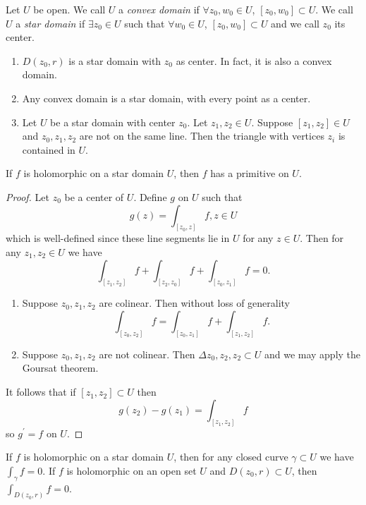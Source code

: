 \begin{defn}
Let $U$ be open.
We call $U$ a \emph{convex domain} if $\forall z_0, w_0 \in U$,
$[z_0, w_0] \subset U$. We call $U$ a \emph{star domain} if
$\exists z_0 \in U$ such that $\forall w_0 \in U$,
$[z_0, w_0] \subset U$ and we call $z_0$ its center.
\end{defn}

\begin{obsv}
  \begin{enumerate}
    \item{
      $D(z_0, r)$ is a star domain with $z_0$ as center. In fact,
      it is also a convex domain.
    }
    \item{
      Any convex domain is a star domain, with every point as a center.
    }
    \item{
      Let $U$ be a star domain with center $z_0$. Let $z_1, z_2 \in U$.
      Suppose $[z_1, z_2] \in U$ and $z_0, z_1, z_2$ are not on the same
      line. Then the triangle with vertices $z_i$ is contained in $U$.
    }
  \end{enumerate}
\end{obsv}

\begin{theorem}
If $f$ is holomorphic on a star domain $U$, then $f$ has a primitive on $U$.
\end{theorem}
\begin{proof}
Let $z_0$ be a center of $U$. Define $g$ on $U$ such that
$$
g(z) = \int_{[z_0, z]} f, z \in U
$$
which is well-defined since these line segments lie in $U$ for any
$z \in U$. Then for any $z_1, z_2 \in U$ we have
$$
\int_{[z_1, z_2]} f + \int_{[z_2, z_0]} f + \int_{[z_0, z_1]} f = 0.
$$

\begin{enumerate}
  \item{
    Suppose $z_0, z_1, z_2$ are colinear. Then without loss of generality
    $$
    \int_{[z_0, z_2]} f = \int_{[z_0, z_1]} f + \int_{[z_1, z_2]} f.
    $$
  }
  \item{
    Suppose $z_0, z_1, z_2$ are not colinear. Then
    $\Delta z_0, z_2, z_2 \subset U$ and we may apply the Goursat theorem.
  }
\end{enumerate}
It follows that if $[z_1, z_2] \subset U$ then
$$
g(z_2) - g(z_1) = \int_{[z_1, z_2]} f
$$
so $g^\prime = f$ on $U$.
\end{proof}

\begin{corol}
If $f$ is holomorphic on a star domain $U$, then for any closed curve
$\gamma \subset U$ we have $\int_\gamma f = 0$. If $f$ is holomorphic on
an open set $U$ and $D(z_0, r) \subset U$, then $\int_{D(z_0, r)} f = 0$.
\end{corol}

